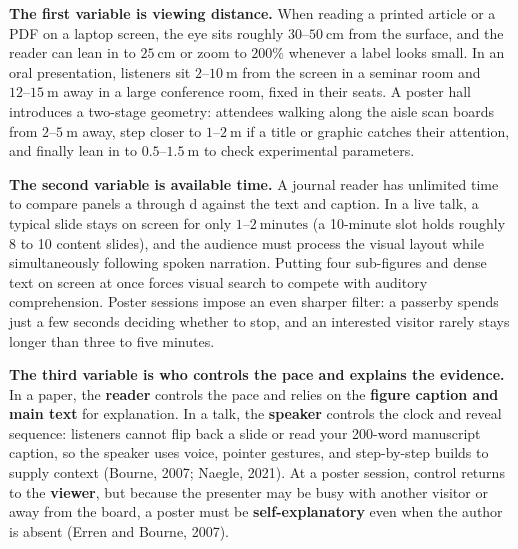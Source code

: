 \textbf{The first variable is viewing distance.} When reading a printed article or a PDF on a laptop screen, the eye sits roughly $30\text{--}50\ \text{cm}$ from the surface, and the reader can lean in to $25\ \text{cm}$ or zoom to $200\%$ whenever a label looks small. In an oral presentation, listeners sit $2\text{--}10\ \text{m}$ from the screen in a seminar room and $12\text{--}15\ \text{m}$ away in a large conference room, fixed in their seats. A poster hall introduces a two-stage geometry: attendees walking along the aisle scan boards from $2\text{--}5\ \text{m}$ away, step closer to $1\text{--}2\ \text{m}$ if a title or graphic catches their attention, and finally lean in to $0.5\text{--}1.5\ \text{m}$ to check experimental parameters.

\textbf{The second variable is available time.} A journal reader has unlimited time to compare panels a through d against the text and caption. In a live talk, a typical slide stays on screen for only $1\text{--}2\ \text{minutes}$ (a 10-minute slot holds roughly 8 to 10 content slides), and the audience must process the visual layout while simultaneously following spoken narration. Putting four sub-figures and dense text on screen at once forces visual search to compete with auditory comprehension. Poster sessions impose an even sharper filter: a passerby spends just a few seconds deciding whether to stop, and an interested visitor rarely stays longer than three to five minutes.

\textbf{The third variable is who controls the pace and explains the evidence.} In a paper, the \textbf{reader} controls the pace and relies on the \textbf{figure caption and main text} for explanation. In a talk, the \textbf{speaker} controls the clock and reveal sequence: listeners cannot flip back a slide or read your 200-word manuscript caption, so the speaker uses voice, pointer gestures, and step-by-step builds to supply context (Bourne, 2007; Naegle, 2021). At a poster session, control returns to the \textbf{viewer}, but because the presenter may be busy with another visitor or away from the board, a poster must be \textbf{self-explanatory} even when the author is absent (Erren and Bourne, 2007).

